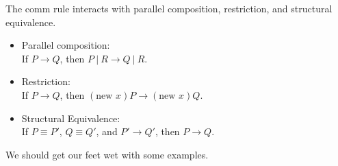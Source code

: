 \documentclass[12pt]{article}
\numberwithin{equation}{section}
\begin{document}
The comm rule interacts with parallel composition, restriction, and structural equivalence.
\begin{itemize}
\item Parallel composition: \\
If $P \rightarrow Q$, then $P \ | \ R \rightarrow Q \ | \ R$.

\item Restriction: \\
If $P \rightarrow Q$, then $(\text{new } x)P \rightarrow (\text{new } x)Q$.

\item Structural Equivalence: \\
If $P \equiv P'$, $Q \equiv Q'$, and $P' \rightarrow Q'$, then $P \rightarrow Q$.
\end{itemize}

We should get our feet wet with some examples.
\end{document}

